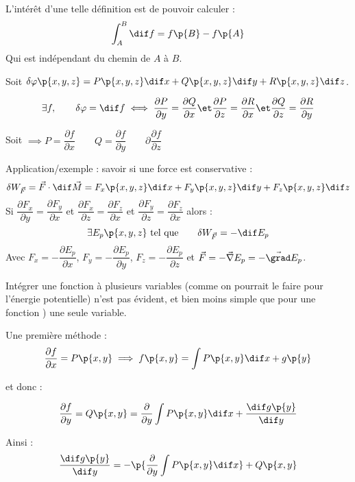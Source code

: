     L'intérêt d'une telle définition est de pouvoir calculer :
    \[ \int_A^B \dif f = f\p{B} - f\p{A}\]
    Qui est indépendant du chemin de $A$ à $B$.
    
    \begin{theorem}{}{}
        Soit $\delta \varphi\p{x, y, z} = P\p{x, y, z}\dif x + Q\p{x, y, z}\dif y + R\p{x, y, z}\dif z$.
        
        \[ \exists f,\qquad \delta \varphi = \dif f \iff \dfrac{\partial P}{\partial y} = \dfrac{\partial Q}{\partial x} \et \dfrac{\partial P}{\partial z} = \dfrac{\partial R}{\partial x} \et \dfrac{\partial Q}{\partial z} = \dfrac{\partial R}{\partial y}\]
        
        Soit $\implies P = \dfrac{\partial f}{\partial x} \qquad Q = \dfrac{\partial f}{\partial y} \qquad \partial \dfrac{\partial f}{\partial z}$
    \end{theorem}
    
    Application/exemple : savoir si une force est conservative :
    \[ \delta W_{\vec{F}} = \vec{F} \cdot \dif \vec{M} = F_x\p{x, y, z}\dif x + F_y\p{x, y, z}\dif y + F_z\p{x, y, z}\dif z\]
    Si $\dfrac{\partial F_x}{\partial y} = \dfrac{\partial F_y}{\partial x}$ et $\dfrac{\partial F_x}{\partial z} = \dfrac{\partial F_z}{\partial x}$ et $\dfrac{\partial F_y}{\partial z} = \dfrac{\partial F_z}{\partial x}$ alors :
    \[ \exists E_p\p{x, y, z} \ \text{tel que}\qquad \delta W_{\vec{F}} = -\dif E_p\]
    Avec $F_x = -\dfrac{\partial E_p}{\partial x}$, $F_y = -\dfrac{\partial E_p}{\partial y}$, $F_z = -\dfrac{\partial E_p}{\partial z}$ et $\vec{F} = -\vec{\nabla} E_p = -\vec{\grad} E_p$.
    
    \begin{warning}{}{}
        Intégrer une fonction à plusieurs variables (comme on pourrait le faire pour l'énergie potentielle) n'est pas évident, et bien moins simple que pour une fonction ) une seule variable.
    \end{warning}
    
    Une première méthode : 
    \[ \dfrac{\partial f}{\partial x} = P\p{x, y} \implies f\p{x, y} = \int P\p{x, y} \dif x + g\p{y} \]
    
    et donc :
    
    \[ \dfrac{\partial f}{\partial y} = Q\p{x, y} = \dfrac{\partial}{\partial y } \int P\p{x, y} \dif x + \dfrac{\dif g\p{y}}{\dif y}\]
    
    Ainsi :
    \[ \dfrac{\dif g\p{y}}{\dif y} = -\p{\dfrac{\partial}{\partial y}\int P\p{x, y}\dif x} + Q\p{x, y}\]
    
